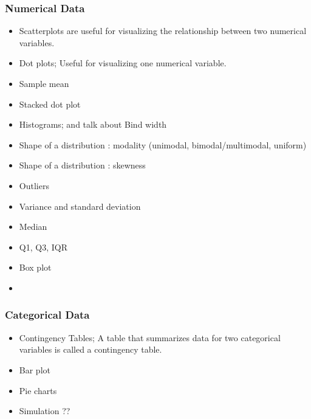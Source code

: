 \begin{frame}
    \frametitle{Numerical Data}
    \begin{itemize}
        \item Scatterplots are useful for visualizing the relationship between two
        numerical variables.
        \item Dot plots; Useful for visualizing one numerical variable. 
        \item Sample mean 
        \item Stacked dot plot
        \item Histograms; and talk about Bind width
        \item Shape of a distribution : modality (unimodal, bimodal/multimodal, uniform)
        \item Shape of a distribution : skewness
        \item Outliers
        \item Variance and standard deviation 
        \item Median
        \item Q1, Q3, IQR
        \item Box plot
        \item 
    \end{itemize}
\end{frame}


\begin{frame}
    \frametitle{Categorical Data}
    
    \begin{itemize}
        \item Contingency Tables; A table that summarizes data for two categorical variables is called
        a contingency table.
        \item Bar plot
        \item Pie charts
        \item Simulation ??
    \end{itemize}
    \end{frame}




